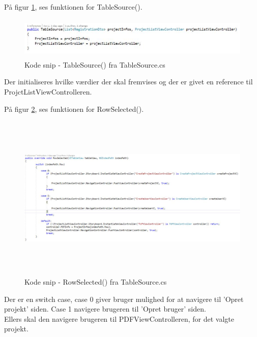 På figur \ref{fig:TableSource}, ses funktionen for TableSource().
\begin{figure}[H] %
	\centering
	\includegraphics[height=2cm, width=15cm]{../ArkitekturDesign/Design/ProjectList/TableSource}
	\caption{Kode snip - TableSource() fra TableSource.cs}
	\label{fig:TableSource}
\end{figure}
Der initialiseres hvilke værdier der skal fremvises og der er givet en reference til ProjctListViewControlleren.

På figur \ref{fig:RowSelection}, ses funktionen for RowSelected().
\begin{figure}[H] %
	\centering
	\includegraphics[height=8cm, width=17cm]{../ArkitekturDesign/Design/ProjectList/RowSelection}
	\caption{Kode snip - RowSelected() fra TableSource.cs}
	\label{fig:RowSelection}
\end{figure}
Der er en switch case, case 0 giver bruger mulighed for at navigere til 'Opret projekt' siden. Case 1 navigere brugeren til 'Opret bruger' siden. \\
Ellers skal den navigere brugeren til PDFViewControlleren, for det valgte projekt.

\clearpage
